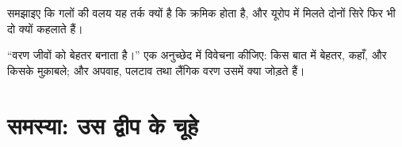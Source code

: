 \begin{exercise}[$\star\star\star$]\label{exo:g12:selection-drift-speciation:14}
समझाइए कि गलों की वलय  यह तर्क क्यों है कि  क्रमिक होता है,
और यूरोप में मिलते दोनों सिरे फिर भी दो  क्यों कहलाते हैं।
\end{exercise}

\begin{exercise}[$\star\star\star$]\label{exo:g12:selection-drift-speciation:15}
``वरण जीवों को बेहतर बनाता है।'' एक अनुच्छेद में विवेचना कीजिए: किस बात में
बेहतर, कहाँ, और किसके मुक़ाबले; और अपवाह, पलटाव तथा लैंगिक वरण उसमें क्या
जोड़ते हैं।
\end{exercise}

\section{समस्या: उस द्वीप के चूहे}

